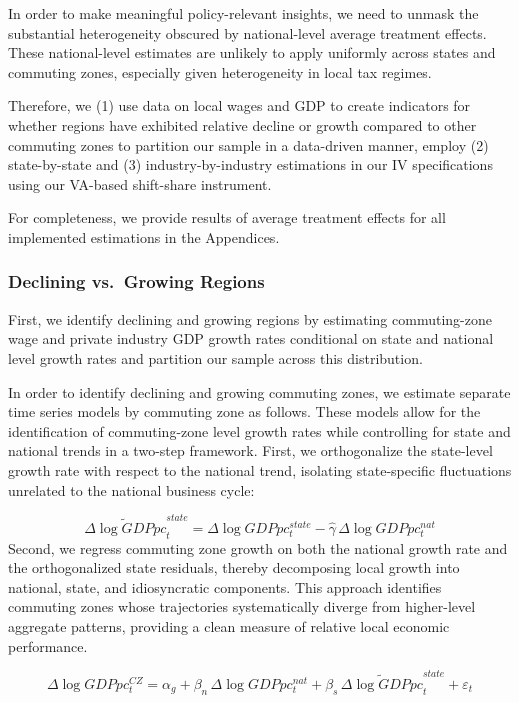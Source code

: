 \documentclass[
  10pt,
]{article}
\begin{document}
In order to make meaningful policy-relevant insights, we need to unmask
the substantial heterogeneity obscured by national-level average
treatment effects. These national-level estimates are unlikely to apply
uniformly across states and commuting zones, especially given
heterogeneity in local tax regimes.

Therefore, we (1) use data on local wages and GDP to create indicators
for whether regions have exhibited relative decline or growth compared
to other commuting zones to partition our sample in a data-driven
manner, employ (2) state-by-state and (3) industry-by-industry
estimations in our IV specifications using our VA-based shift-share
instrument.

For completeness, we provide results of average treatment effects for
all implemented estimations in the Appendices.

\subsubsection{Declining vs.~Growing Regions}\label{sec-growthrates}

First, we identify declining and growing regions by estimating
commuting-zone wage and private industry GDP growth rates conditional on
state and national level growth rates and partition our sample across
this distribution.

In order to identify declining and growing commuting zones, we estimate
separate time series models by commuting zone as follows. These models
allow for the identification of commuting-zone level growth rates while
controlling for state and national trends in a two-step framework.
First, we orthogonalize the state-level growth rate with respect to the
national trend, isolating state-specific fluctuations unrelated to the
national business cycle:

\[
\widetilde{\Delta \log GDPpc}^{state}_{t} 
= \Delta \log GDPpc^{state}_{t} 
- \hat{\gamma}\, \Delta \log GDPpc^{nat}_{t}
\] Second, we regress commuting zone growth on both the national growth
rate and the orthogonalized state residuals, thereby decomposing local
growth into national, state, and idiosyncratic components. This approach
identifies commuting zones whose trajectories systematically diverge
from higher-level aggregate patterns, providing a clean measure of
relative local economic performance.

\[
\Delta \log GDPpc^{CZ}_{t} 
= \alpha_{g} 
+ \beta_{n} \, \Delta \log GDPpc^{nat}_{t} 
+ \beta_{s} \, \widetilde{\Delta \log GDPpc}^{state}_{t} 
+ \varepsilon_{t}
\]
\end{document}
